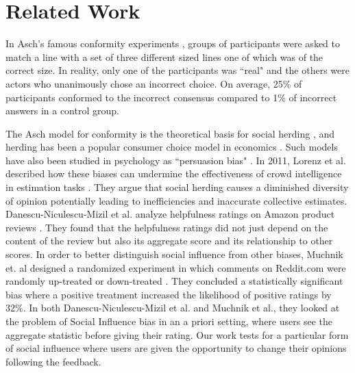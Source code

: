 \section{Related Work}
In Asch's famous conformity experiments \cite{asch1956studies, asch1955opinions, bond1996culture}, groups of participants were asked to match a line with a set of three different sized lines one of which was of the correct size.
In reality, only one of the participants was ``real" and the others were actors who unanimously chose an incorrect choice.
On average, 25\% of participants conformed to the incorrect consensus compared to 1\% of incorrect answers in a control group.

The Asch model for conformity is the theoretical basis for social herding \cite{banerjee1992simple,bikhchandani2000herd}, and herding has been a popular consumer choice model in economics \cite{burnkrant1975informational,dholakia2002auction,huang2006herding}. 
Such models have also been studied in psychology as ``persuasion bias" \cite{demarzo2003persuasion}.
In 2011, Lorenz et al. described how these biases can undermine the effectiveness of crowd intelligence in estimation tasks \cite{lorenz2011social}. 
They argue that social herding causes a diminished diversity of opinion potentially leading to inefficiencies and inaccurate collective estimates.
Danescu-Niculescu-Mizil et al. analyze helpfulness ratings on Amazon product reviews \cite{danescu2009opinions}.
They found that the helpfulness ratings did not just depend on the content of the review but also its aggregate score and its relationship to other scores.
In order to better distinguish social influence from other biases, Muchnik et. al designed a randomized experiment in which comments on Reddit.com were randomly up-treated or down-treated \cite{muchnik2013social}.
They concluded a statistically significant bias where a positive treatment increased the likelihood of positive ratings by 32\%. 
In both Danescu-Niculescu-Mizil et al. and Muchnik et al., they looked at the problem of Social Influence bias in an a priori setting, where users see the aggregate statistic before giving their rating.
Our work tests for a particular form of social influence where users are given the opportunity to change their opinions following the feedback. 

